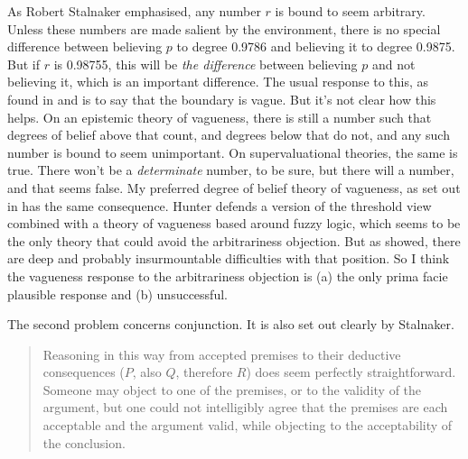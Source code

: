 As Robert Stalnaker \citeyearpar[91]{Stalnaker1984} emphasised, any number \(r\) is bound to seem arbitrary. Unless these numbers are made salient by the environment, there is no special difference between believing \(p\) to degree 0.9786 and believing it to degree 0.9875. But if \(r\) is 0.98755, this will be \textit{the difference} between believing \(p\) and not believing it, which is an important difference. The usual response to this, as found in \cite[Ch. 4]{Foley1993} and \citet{Hunter1996} is to say that the boundary is vague. But it's not clear how this helps. On an epistemic theory of vagueness, there is still a number such that degrees of belief above that count, and degrees below that do not, and any such number is bound to seem unimportant. On supervaluational theories, the same is true. There won't be a \textit{determinate} number, to be sure, but there will a number, and that seems false. My preferred degree of belief theory of vagueness, as set out in \citet{Weatherson2005-WEATTT} has the same consequence. Hunter defends a version of the threshold view combined with a theory of vagueness based around fuzzy logic, which seems to be the only theory that could avoid the arbitrariness objection. But as \citet{Williamson1994-WILV} showed, there are deep and probably insurmountable difficulties with that position. So I think the vagueness response to the arbitrariness objection is (a) the only prima facie plausible response and (b) unsuccessful. 

The second problem concerns conjunction. It is also set out clearly by Stalnaker.

\begin{quote}
Reasoning in this way from accepted premises to their deductive consequences (\(P\), also \(Q\), therefore \(R\)) does seem perfectly straightforward. Someone may object to one of the premises, or to the validity of the argument, but one could not intelligibly agree that the premises are each acceptable and the argument valid, while objecting to the acceptability of the conclusion. \cite[92]{Stalnaker1984}
\end{quote}

